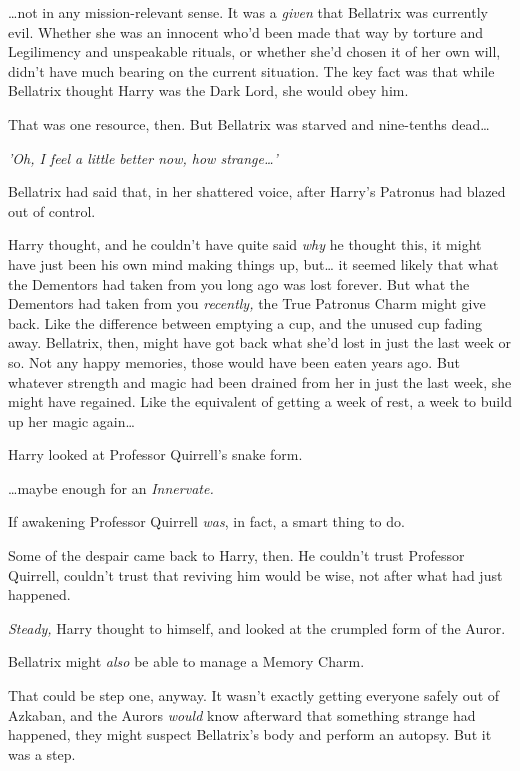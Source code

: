 {\ldots}not in any mission-relevant sense. It was a \emph{given} that Bellatrix 
was currently evil. Whether she was an innocent who'd been made that way by 
torture and Legilimency and unspeakable rituals, or whether she'd chosen it of 
her own will, didn't have much bearing on the current situation. The key fact 
was that while Bellatrix thought Harry was the Dark Lord, she would obey him.

That was one resource, then. But Bellatrix was starved and nine-tenths 
dead{\ldots}

\emph{'Oh, I feel a little better now, how strange{\ldots}'}

Bellatrix had said that, in her shattered voice, after Harry's Patronus had 
blazed out of control.

Harry thought, and he couldn't have quite said \emph{why} he thought this, it 
might have just been his own mind making things up, but{\ldots} it seemed 
likely that what the Dementors had taken from you long ago was lost forever. 
But what the Dementors had taken from you \emph{recently,} the True Patronus 
Charm might give back. Like the difference between emptying a cup, and the 
unused cup fading away. Bellatrix, then, might have got back what she'd lost in 
just the last week or so. Not any happy memories, those would have been eaten 
years ago. But whatever strength and magic had been drained from her in just 
the last week, she might have regained. Like the equivalent of getting a week 
of rest, a week to build up her magic again{\ldots}

Harry looked at Professor Quirrell's snake form.

{\ldots}maybe enough for an \emph{Innervate.}

If awakening Professor Quirrell \emph{was}, in fact, a smart thing to do.

Some of the despair came back to Harry, then. He couldn't trust Professor 
Quirrell, couldn't trust that reviving him would be wise, not after what had 
just happened.

\emph{Steady,} Harry thought to himself, and looked at the crumpled form of the 
Auror.

Bellatrix might \emph{also} be able to manage a Memory Charm.

That could be step one, anyway. It wasn't exactly getting everyone safely out 
of Azkaban, and the Aurors \emph{would} know afterward that something strange 
had happened, they might suspect Bellatrix's body and perform an autopsy. But 
it was a step.

